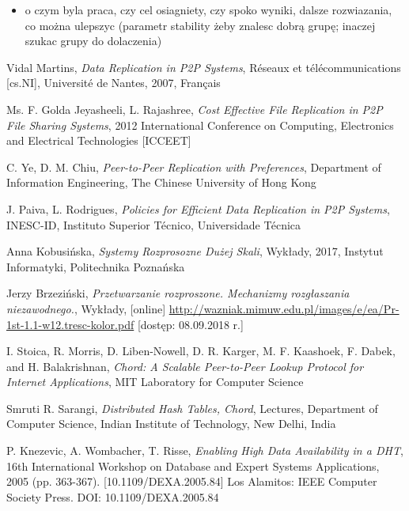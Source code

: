 \documentclass[12pt, twoside, openany]{report}
\begin{document}
\begin{itemize}
\item o czym byla praca, czy cel osiagniety, czy spoko wyniki, dalsze rozwiazania, co można ulepszyc (parametr stability żeby znalesc dobrą grupę; inaczej szukac grupy do dolaczenia)
\end{itemize}




\begin{thebibliography}{11}

 Vidal Martins, \emph{Data Replication in P2P Systems}, Réseaux et télécommunications [cs.NI], Université de Nantes, 2007, Français

 Ms. F. Golda Jeyasheeli, L. Rajashree, \emph{Cost Effective File Replication in P2P File Sharing Systems}, 2012 International Conference on Computing, Electronics and Electrical Technologies [ICCEET]
 
 C. Ye, D. M. Chiu, \emph{Peer-to-Peer Replication with Preferences}, Department of Information Engineering, The Chinese University of Hong Kong

 J. Paiva, L. Rodrigues, \emph{Policies for Efficient Data Replication in P2P Systems}, INESC-ID, Instituto Superior Técnico, Universidade Técnica

 Anna Kobusińska, \emph{Systemy Rozprosozne Dużej Skali}, Wykłady, 2017, Instytut Informatyki, Politechnika Poznańska

 Jerzy Brzeziński, \emph{Przetwarzanie rozproszone. Mechanizmy rozgłaszania niezawodnego.}, Wykłady, [online] \url{http://wazniak.mimuw.edu.pl/images/e/ea/Pr-1st-1.1-w12.tresc-kolor.pdf} [dostęp: 08.09.2018 r.]

  I. Stoica, R. Morris, D. Liben-Nowell, D. R. Karger, M. F. Kaashoek, F. Dabek, and H. Balakrishnan, \emph{Chord: A Scalable Peer-to-Peer Lookup Protocol for Internet Applications}, MIT Laboratory for Computer Science

 Smruti R. Sarangi, \emph{Distributed Hash Tables, Chord}, Lectures, Department of Computer Science, Indian Institute of Technology, New Delhi, India

 P. Knezevic, A. Wombacher, T. Risse, \emph{Enabling High Data Availability in a DHT}, 16th International Workshop on Database and Expert Systems Applications, 2005 (pp. 363-367). [10.1109/DEXA.2005.84] Los Alamitos: IEEE Computer Society Press. DOI: 10.1109/DEXA.2005.84


\end{thebibliography}
\end{document}
